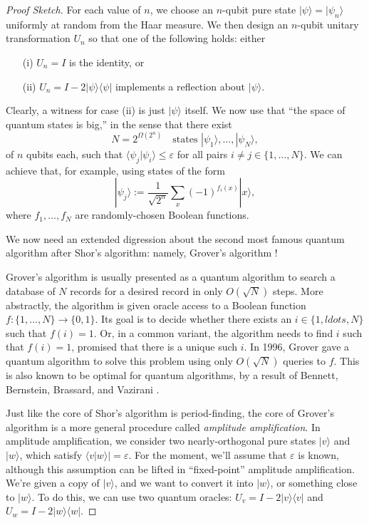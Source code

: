 \documentclass[12pt]{report}
\theoremstyle{plain}
\theoremstyle{definition}
\renewcommand{\bra}[1]{\langle#1|}
\renewcommand{\ket}[1]{|#1\rangle}
\newcommand{\braket}[2]{\langle#1|#2\rangle}
\begin{document}
\begin{proof}[Proof Sketch]
  For each value of $n$, we choose an $n$-qubit pure state $\ket{\psi}=\ket{\psi_n}$ uniformly at random from the
  Haar measure.  We then design an $n$-qubit unitary transformation $U_n$ so that one of the following holds: either
\begin{enumerate}
\item[(i)] $U_n =I$ is the identity, or
\item[(ii)] $U_n =I- 2 \ket{\psi}\bra{\psi}$ implements a reflection about $\ket{\psi}$.
\end{enumerate}
Clearly, a witness for case (ii) is just $\ket{\psi}$ itself.
  We now use that ``the space of quantum states is big,'' in the sense that there exist
   $$ N = 2^{\Omega ( 2^n)}  \hspace{1em} \text{states }
    \ket{ \psi_1}, \ldots, \ket{ \psi_N }, $$
  of $n$ qubits each, such that $\braket{ \psi_j}{ \psi_i} \leq \varepsilon$ for all
  pairs $i \neq j \in \{ 1, \ldots, N \}$.  We can achieve that, for example, using states of the form
  \[
  \ket{ \psi_j } := \frac{1}{\sqrt{2^n}} \sum_x ( - 1)^{f_i ( x)} \ket{ x},
  \]
  where $f_1, \ldots, f_N$ are randomly-chosen Boolean functions.

  We now need an extended digression about the second most famous quantum algorithm after Shor's algorithm: namely, Grover's algorithm \cite{grover}!

  Grover's algorithm is usually presented as a quantum algorithm to search a database of $N$ records for a desired record in only $O(\sqrt{N})$ steps.  More abstractly, the algorithm
  is given oracle access to a Boolean function $f : \{ 1, \ldots, N \} \rightarrow \{ 0, 1 \}$.  Its goal is to decide whether there exists an $i\in \{ 1,ldots,N\}$ such that $f ( i) = 1$. Or, in a common variant, the algorithm needs to find $i$ such that $f(i)=1$, promised that there is a unique such $i$.  In 1996, Grover \cite{grover} gave a quantum algorithm to solve this problem using only $O ( \sqrt{N} )$ queries
  to $f$.  This is also known to be optimal for quantum algorithms, by a result of Bennett, Bernstein, Brassard, and Vazirani \cite{bbbv}.

  Just like the core of Shor's algorithm is period-finding, the core of Grover's algorithm is a more general procedure called {\em amplitude amplification}.  In amplitude amplification,
  we consider two nearly-orthogonal pure states $\ket{ v }$ and $\ket{ w }$, which satisfy
  $\braket{ v }{ w } | = \varepsilon$.
  For the moment, we'll assume that $\varepsilon$ is known, although this assumption can be lifted in ``fixed-point'' amplitude amplification.  We're given a copy of $\ket{v}$, and
  we want to convert it into $\ket{w}$, or something close to $\ket{w}$.  To do this, we can use two quantum oracles: $U_v = I- 2 \ket{v}\bra{v}$ and $U_w = I- 2 \ket{w}\bra{w}$.


\end{proof}
\end{document}
